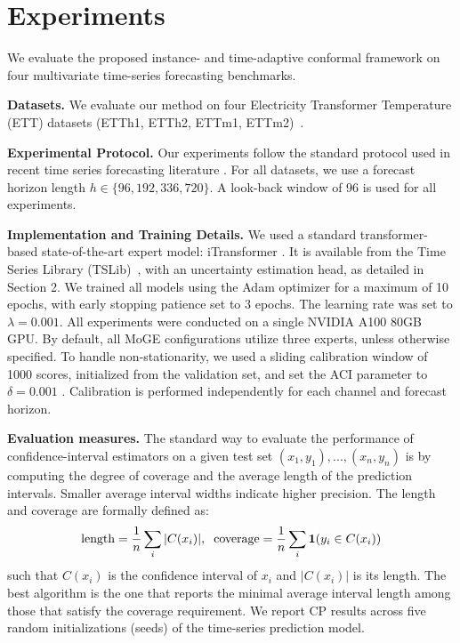 \section{Experiments}\label{sec:experiments}


We evaluate the proposed instance- and time-adaptive conformal framework on four multivariate time-series forecasting benchmarks.

\label{sec:experimental_setup}
\textbf{Datasets.}
We evaluate our method on 
four Electricity Transformer Temperature (ETT) datasets (ETTh1, ETTh2, ETTm1, ETTm2)~\cite{informer}.



\textbf{Experimental Protocol.} Our experiments follow the standard protocol used in recent time series forecasting literature \cite{Yuqietal-2023-PatchTST,liu2023itransformer, wang2024deep}. For  all datasets, we use a forecast horizon length $h \in \{96,192,336,720\}$. A look-back window of 96 is used for all experiments. 

\textbf{Implementation and Training Details.}
 We used a standard transformer-based state-of-the-art expert model: iTransformer \cite{liu2023itransformer}. It is available from the Time Series Library (TSLib)~\cite{wang2026deep}, with an uncertainty estimation head, as detailed in Section 2.  We trained all models using the Adam optimizer for a maximum of 10 epochs, with early stopping patience set to 3 epochs. The learning rate was set to $\lambda=0.001$. All experiments were conducted on a single NVIDIA A100 80GB GPU. By default, all MoGE configurations utilize three experts, unless otherwise specified.
To handle non-stationarity, we used a sliding calibration window of 1000 scores, initialized from the validation set, and set the ACI parameter to $\delta=0.001$ \cite{gibbs2021adaptive}. Calibration is performed independently for each channel and forecast horizon.






\textbf{Evaluation measures.} The standard way to evaluate the performance of confidence-interval estimators on a given test set $(x_1,y_1),...,(x_n,y_n)$ is by computing the degree of coverage and the average length of the prediction intervals.   Smaller average interval widths indicate higher precision.  The length and coverage are formally defined as:
$$ \textrm{length} = \frac{1}{n} \sum_i | C(x_i) |,
\hspace{0.2cm}  \textrm{coverage} = \frac{1}{n} \sum_i 
{\textbf 1}(y_i \in C(x_i))$$
such that $C(x_i)$ is the confidence interval of  $x_i$  and $|C(x_i)|$ is its length.
The best algorithm is the one that reports the minimal average interval length among those that satisfy the coverage requirement. We report CP results across five random initializations (seeds) of the time-series prediction model.   

